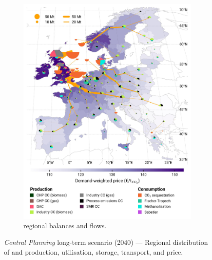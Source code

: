 \documentclass[final,5p,times,twocolumn,sort&compress]{elsarticle}
\begin{document}
\begin{figure}[htbp]
\begin{subfigure}[t]{0.49\textwidth}
      \includegraphics[width=1\textwidth]{maps/greenfield-pipelines/base_s_adm___2040-balance_map_co2_stored} 
      \vspace{-0.7cm}
      \caption{ regional balances and flows.}
      \label{fig:CP_lt_2040_co2}
  \end{subfigure}
  \caption{\textit{Central Planning} long-term scenario (2040) --- Regional distribution of  and  production, utilisation, storage, transport, and price.}
  \label{fig:CP_lt_2040}
\end{figure}
\end{document}
